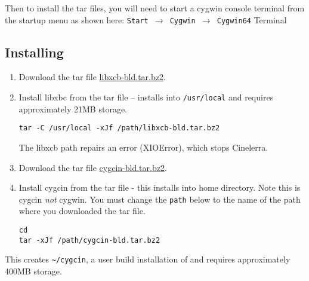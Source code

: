 Then to install the \CGG{} tar files, you will need to start a
cygwin console terminal from the startup menu as shown here:
\texttt{Start $\rightarrow$ Cygwin $\rightarrow$ Cygwin64}
Terminal

\subsection*{Installing \CGG{}}
\label{sec:installing_cinelerra}

\begin{enumerate}
\item Download the tar file
  \href{https://cinelerra-gg.org/download/testing/libxcb-bld.tar.bz2}{libxcb-bld.tar.bz2}.

\item Install libxbc from the tar file -- installs into
  \texttt{/usr/local} and requires approximately 21MB storage.
\begin{lstlisting}[style=sh]
tar -C /usr/local -xJf /path/libxcb-bld.tar.bz2
\end{lstlisting}
  The libxcb path repairs an error (XIOError), which stops
  Cinelerra.

\item Download the tar file
  \href{https://cinelerra-gg.org/download/testing/cygcin-bld.tar.bz2}{cygcin-bld.tar.bz2}.

\item Install cygcin from the tar file - this installs into home
  directory.  Note this is cygcin \emph{not} cygwin. You must change the
  \texttt{path} below to the name of the path where you downloaded
  the tar file.
\begin{lstlisting}[style=sh]
cd
tar -xJf /path/cygcin-bld.tar.bz2
\end{lstlisting}
\end{enumerate}

This creates \texttt{\~{}/cygcin}, a user build installation of
\CGG{} and requires approximately 400MB storage.

